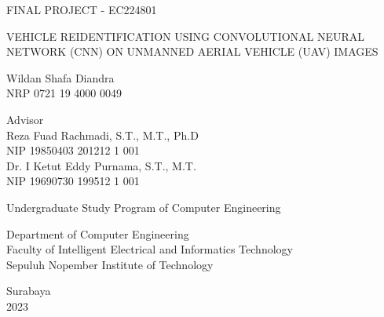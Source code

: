 \begin{large}
  FINAL PROJECT - EC224801
\end{large}

\vspace{\fill}

\begin{spacing}{1}
  \justify\Large{
    VEHICLE REIDENTIFICATION USING CONVOLUTIONAL NEURAL
    NETWORK (CNN) ON UNMANNED AERIAL VEHICLE (UAV) IMAGES
  }
\end{spacing}

\vspace{\fill}

\begin{large}
  Wildan Shafa Diandra \\
  \textnormal{NRP 0721 19 4000 0049}
\end{large}

\vspace{\fill}

\begin{large}
  \textnormal{Advisor} \\
  Reza Fuad Rachmadi, S.T., M.T., Ph.D \\
  \textnormal{NIP 19850403 201212 1 001} \\
  Dr. I Ketut Eddy Purnama, S.T., M.T. \\
  \textnormal{NIP 19690730 199512 1 001} \\
\end{large}

\vspace{\fill}

Undergraduate Study Program of Computer Engineering \\

\normalfont

Department of Computer Engineering \\
Faculty of Intelligent Electrical and Informatics Technology \\
Sepuluh Nopember Institute of Technology

Surabaya \\
2023
